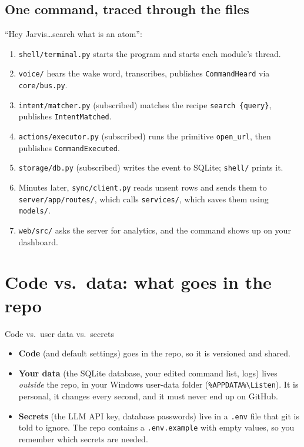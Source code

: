 \documentclass[11pt,a4paper]{article}
\begin{document}
\subsection{One command, traced through the files}
``Hey Jarvis\ldots search what is an atom'':
\begingroup\sloppy
\begin{enumerate}[nosep]
  \item \texttt{shell/terminal.py} starts the program and starts each module's thread.
  \item \texttt{voice/} hears the wake word, transcribes, publishes \texttt{CommandHeard} via \texttt{core/bus.py}.
  \item \texttt{intent/matcher.py} (subscribed) matches the recipe \texttt{search \{query\}}, publishes \texttt{IntentMatched}.
  \item \texttt{actions/executor.py} (subscribed) runs the primitive \texttt{open\_url}, then
        publishes \texttt{CommandExecuted}.
  \item \texttt{storage/db.py} (subscribed) writes the event to SQLite; \texttt{shell/} prints it.
  \item Minutes later, \texttt{sync/client.py} reads unsent rows and sends them to
        \texttt{server/app/routes/}, which calls \texttt{services/}, which saves them using
        \texttt{models/}.
  \item \texttt{web/src/} asks the server for analytics, and the command shows up on your dashboard.
\end{enumerate}
\endgroup

\section{Code vs.\ data: what goes in the repo}

\begin{concept}{Code vs.\ user data vs.\ secrets}
\begin{itemize}[nosep]
  \item \textbf{Code} (and default settings) goes in the repo, so it is versioned and shared.
  \item \textbf{Your data} (the SQLite database, your edited command list, logs) lives
        \emph{outside} the repo, in your Windows user-data folder
        (\texttt{\%APPDATA\%\textbackslash Listen}). It is personal, it changes every
        second, and it must never end up on GitHub.
  \item \textbf{Secrets} (the LLM API key, database passwords) live in a \texttt{.env} file that
        git is told to ignore. The repo contains a \texttt{.env.example} with empty
        values, so you remember which secrets are needed.
\end{itemize}
\end{concept}
\end{document}
